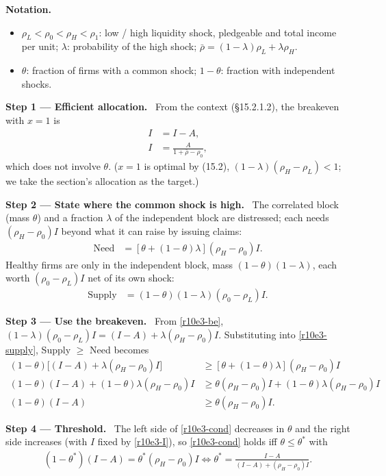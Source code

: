 \documentclass[11pt,a4paper]{article}
\newcommand{\notation}{\par\noindent\textbf{Notation.}}
\newcommand{\step}[2]{\par\medskip\noindent\textbf{Step #1 --- #2.}~}
\begin{document}
\notation
\begin{itemize}
  \item $\rho_L<\rho_0<\rho_H<\rho_1$: low / high liquidity shock, pledgeable and total income per unit; $\lambda$: probability of the high shock; $\bar\rho=(1-\lambda)\rho_L+\lambda\rho_H$.
  \item $\theta$: fraction of firms with a common shock; $1-\theta$: fraction with independent shocks.
\end{itemize}

\step{1}{Efficient allocation} From the context (\S15.2.1.2), the breakeven with $x=1$ is
\begin{align}
  [(1-\lambda)(\rho_0-\rho_L)-\lambda(\rho_H-\rho_0)]I &= I-A, \label{r10e3-be}\\
  I &= \frac{A}{1+\bar\rho-\rho_0}, \label{r10e3-I}
\end{align}
which does not involve $\theta$. ($x=1$ is optimal by (15.2), $(1-\lambda)(\rho_H-\rho_L)<1$; we take the section's allocation as the target.)

\step{2}{State where the common shock is high} The correlated block (mass $\theta$) and a fraction $\lambda$ of the independent block are distressed; each needs $(\rho_H-\rho_0)I$ beyond what it can raise by issuing claims:
\begin{align}
  \text{Need} &= [\theta+(1-\theta)\lambda](\rho_H-\rho_0)I. \label{r10e3-need}
\end{align}
Healthy firms are only in the independent block, mass $(1-\theta)(1-\lambda)$, each worth $(\rho_0-\rho_L)I$ net of its own shock:
\begin{align}
  \text{Supply} &= (1-\theta)(1-\lambda)(\rho_0-\rho_L)I. \label{r10e3-supply}
\end{align}

\step{3}{Use the breakeven} From \eqref{r10e3-be}, $(1-\lambda)(\rho_0-\rho_L)I=(I-A)+\lambda(\rho_H-\rho_0)I$. Substituting into \eqref{r10e3-supply}, Supply $\geq$ Need becomes
\begin{align}
  (1-\theta)\bigl[(I-A)+\lambda(\rho_H-\rho_0)I\bigr] &\geq [\theta+(1-\theta)\lambda](\rho_H-\rho_0)I \nonumber\\
  (1-\theta)(I-A)+(1-\theta)\lambda(\rho_H-\rho_0)I &\geq \theta(\rho_H-\rho_0)I+(1-\theta)\lambda(\rho_H-\rho_0)I \nonumber\\
  (1-\theta)(I-A) &\geq \theta(\rho_H-\rho_0)I. \label{r10e3-cond}
\end{align}

\step{4}{Threshold} The left side of \eqref{r10e3-cond} decreases in $\theta$ and the right side increases (with $I$ fixed by \eqref{r10e3-I}), so \eqref{r10e3-cond} holds iff $\theta\leq\theta^*$ with
\begin{align}
  (1-\theta^*)(I-A) = \theta^*(\rho_H-\rho_0)I \iff \theta^*=\frac{I-A}{(I-A)+(\rho_H-\rho_0)I}. \label{r10e3-thstar}
\end{align}
\end{document}
